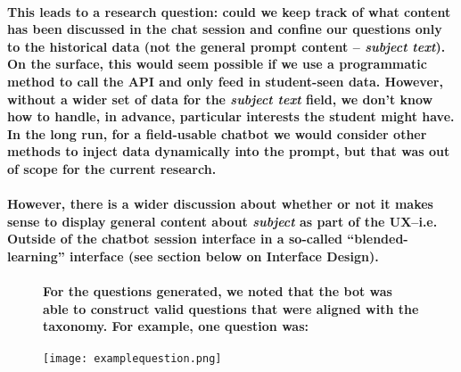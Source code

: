\documentclass{article}
\begin{document}
\paragraph{This leads to a research question: could we keep track of what content has been discussed in the chat session and confine our questions only to the historical data (not the general prompt content – \textit{subject text}). On the surface, this would seem possible if we use a programmatic method to call the API and only feed in student-seen data. However, without a wider set of data for the \textit{subject text} field, we don’t know how to handle, in advance, particular interests the student might have. In the long run, for a field-usable chatbot we would consider other methods to inject data dynamically into the prompt, but that was out of scope for the current research.}

\paragraph{However, there is a wider discussion about whether or not it makes sense to display general content about \textit{subject} as part of the UX–i.e. Outside of the chatbot session interface in a so-called “blended-learning” interface (see section below on Interface Design).}

\newpage



\begin{figure}[htbp]

    \paragraph{For the questions generated, we noted that the bot was able to construct valid questions that were aligned with the taxonomy. For example, one question was:\\}

    \centering
    \texttt{[image: examplequestion.png]}
    \label{fig:example_of_taxonomy}
\end{figure}
\end{document}
